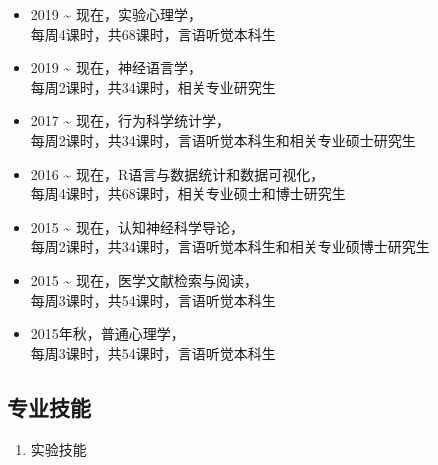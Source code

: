 \documentclass[12pt,]{article}
\providecommand{\tightlist}{%
  \setlength{\itemsep}{0pt}\setlength{\parskip}{0pt}}
\begin{document}
\begin{itemize}
\item
  2019 \textasciitilde{} 现在，实验心理学，\\
  每周4课时，共68课时，言语听觉本科生
\item
  2019 \textasciitilde{} 现在，神经语言学，\\
  每周2课时，共34课时，相关专业研究生
\item
  2017 \textasciitilde{} 现在，行为科学统计学，\\
  每周2课时，共34课时，言语听觉本科生和相关专业硕士研究生
\item
  2016 \textasciitilde{} 现在，R语言与数据统计和数据可视化，\\
  每周4课时，共68课时，相关专业硕士和博士研究生
\item
  2015 \textasciitilde{} 现在，认知神经科学导论，\\
  每周2课时，共34课时，言语听觉本科生和相关专业硕博士研究生
\item
  2015 \textasciitilde{} 现在，医学文献检索与阅读，\\
  每周3课时，共54课时，言语听觉本科生
\item
  2015年秋，普通心理学，\\
  每周3课时，共54课时，言语听觉本科生
\end{itemize}

\hypertarget{section-4}{%
\subsection{专业技能}\label{section-4}}

\begin{enumerate}
\def\labelenumi{\arabic{enumi}.}
\tightlist
\item
  实验技能
\end{enumerate}
\end{document}
